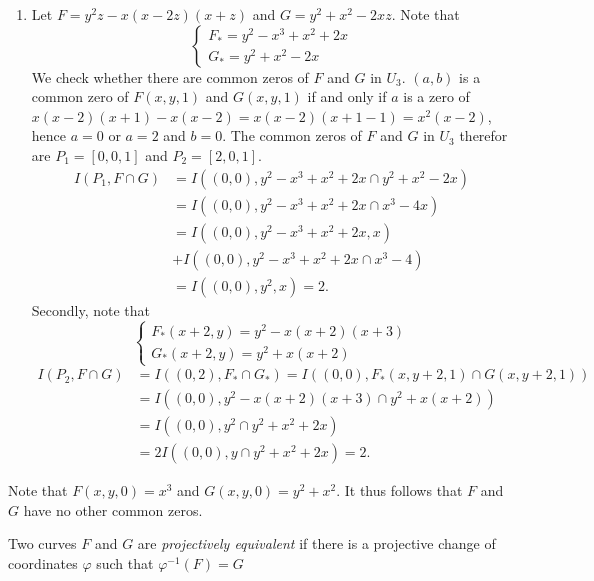     \begin{example}
        \begin{enumerate}
            \item Let $F=y^2z-x(x-2z)(x+z)$ and $G= y^2+x^2-2xz$.
             Note that 
            $$
                \begin{cases}
                    F_\ast = y^2-x^3+x^2+2x\\
                    G_\ast = y^2+x^2-2x
                \end{cases}
            $$
            We check whether there are common zeros of $F$ and $G$ in $U_3$. $(a,b)$ is a common zero of $F(x,y,1)$ and $G(x,y,1)$ if and only if $a$ is a zero of $x(x-2)(x+1)-x(x-2) = x(x-2)(x+1-1)=x^2(x-2)$, hence $a=0$ or $a=2$ and $b=0$. The common zeros of $F$ and $G$ in $U_3$ therefor are $P_1=[0,0,1]$ and $P_2=[2,0,1]$.
            \begin{align*} 
                I(P_1, F\cap G)&= I((0,0),  y^2-x^3+x^2+2x\cap  y^2+x^2-2x)\\ &= I((0,0), y^2-x^3+x^2+2x\cap x^3-4x)\\
                &= I((0,0), y^2-x^3+x^2+2x, x)\\& + I((0,0), y^2-x^3+x^2+2x\cap x^3-4)\\
                &= I((0,0), y^2,x)=2.
            \end{align*}
            Secondly, note that 
            $$
                \begin{cases}
                    F_\ast(x+2,y) = y^2-x(x+2)(x+3)\\
                    G_\ast(x+2,y)= y^2+x(x+2) 
                \end{cases}
            $$
            \begin{align*}
                I(P_2, F\cap G)&= I((0,2),F_\ast\cap G_\ast)=I((0,0),F_\ast(x,y+2,1)\cap G(x,y+2,1)) \\
                &= I((0,0), y^2-x(x+2)(x+3)\cap y^2+x(x+2))\\ &= I((0,0), y^2\cap y^2+ x^2+2x)\\
                &= 2I((0,0),y\cap y^2+x^2+2x)= 2.
            \end{align*}
        \end{enumerate}
        Note that $F(x,y,0)=x^3$ and $G(x,y,0)=y^2+x^2$. It thus follows that $F$ and $G$ have no other common zeros. 
    \end{example}
    \begin{definition}
        Two curves $F$ and $G$ are \textit{projectively equivalent} if there is a projective change of coordinates $\varphi$ such that $\varphi^{-1}(F)=G$
    \end{definition}
